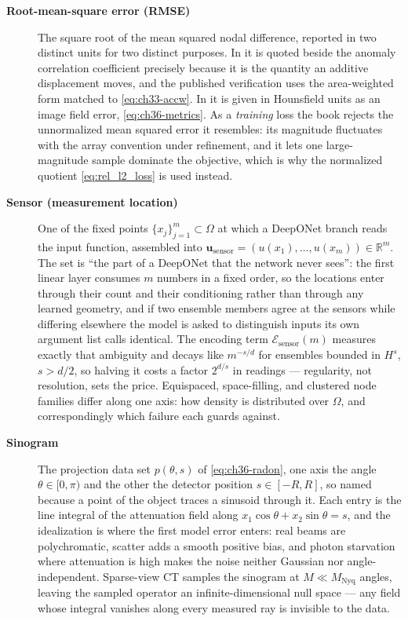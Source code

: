 \begin{description}
\item[\textbf{Root-mean-square error (RMSE)}] The square root of the mean squared nodal
difference, reported in two distinct units for two distinct purposes. In
 it is quoted beside the
anomaly correlation coefficient precisely because it is the quantity an additive
displacement moves, and the published verification uses the area-weighted form matched to
\eqref{eq:ch33-accw}. In  it
is given in Hounsfield units as an image field error, \eqref{eq:ch36-metrics}. As a
\emph{training} loss the book rejects the unnormalized mean squared error it resembles: its
magnitude fluctuates with the array convention under refinement, and it lets one
large-magnitude sample dominate the objective, which is why the normalized quotient
\eqref{eq:rel_l2_loss} is used instead. 

\item[\textbf{Sensor (measurement location)}] One of the fixed points
$\{x_{j}\}_{j=1}^{m} \subset \Omega$ at which a DeepONet branch reads the input function,
assembled into $\mathbf{u}_{\mathrm{sensor}} = (u(x_{1}), \dots, u(x_{m})) \in
\mathbb{R}^{m}$. The set is ``the part of a DeepONet that the network never sees'': the
first linear layer consumes $m$ numbers in a fixed order, so the locations enter through
their count and their conditioning rather than through any learned geometry, and if two
ensemble members agree at the sensors while differing elsewhere the model is asked to
distinguish inputs its own argument list calls identical. The encoding term
$\mathcal{E}_{\text{sensor}}(m)$ measures exactly that ambiguity and decays like $m^{-s/d}$
for ensembles bounded in $H^{s}$, $s > d/2$, so halving it costs a factor $2^{d/s}$ in
readings --- regularity, not resolution, sets the price. Equispaced, space-filling, and
clustered node families differ along one axis: how density is distributed over $\Omega$,
and correspondingly which failure each guards against.

\item[\textbf{Sinogram}] The projection data set $p(\theta, s)$ of \eqref{eq:ch36-radon},
one axis the angle $\theta \in [0, \pi)$ and the other the detector position
$s \in [-R, R]$, so named because a point of the object traces a sinusoid through it.
Each entry is the line integral of the attenuation field along
$x_{1}\cos\theta + x_{2}\sin\theta = s$, and the idealization is where the first model
error enters: real beams are polychromatic, scatter adds a smooth positive bias, and photon
starvation where attenuation is high makes the noise neither Gaussian nor angle-independent.
Sparse-view CT samples the sinogram at $M \ll M_{\text{Nyq}}$ angles, leaving the sampled
operator an infinite-dimensional null space --- any field whose integral vanishes along
every measured ray is invisible to the data. 


\end{description}

